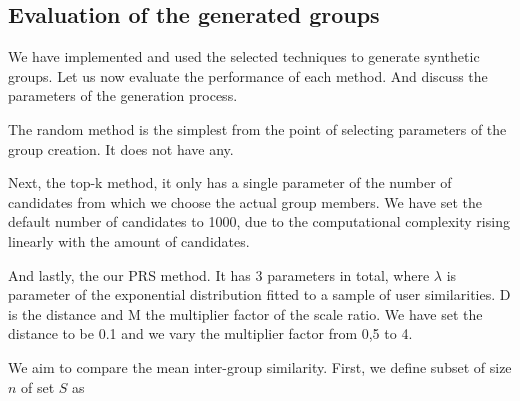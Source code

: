 

\subsection{Evaluation of the generated groups}


We have implemented and used the selected techniques to generate synthetic groups. Let us now evaluate the performance of each method. And discuss the parameters of the generation process.

The random method is the simplest from the point of selecting parameters of the group creation. It does not have any.

Next, the top-k method, it only has a single parameter of the number of candidates from which we choose the actual group members. We have set the default number of candidates to 1000, due to the computational complexity rising linearly with the amount of candidates.

And lastly, the our PRS method. It has 3 parameters in total, where $\lambda$ is parameter of the exponential distribution fitted to a sample of user similarities. D is the distance and M the multiplier factor of the scale ratio. We have set the distance to be 0.1 and we vary the multiplier factor from 0,5 to 4.

We aim to compare the mean inter-group similarity. First, we define subset of size $n$ of set $S$ as

